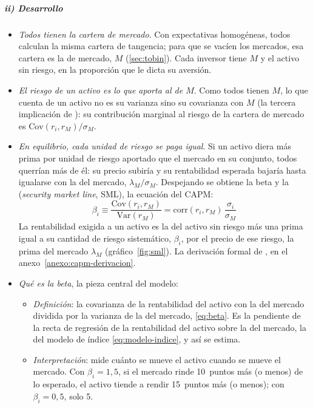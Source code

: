 \documentclass[11pt]{article}
\begin{document}
\subparagraph{ii) Desarrollo}

\begin{itemize}
\item \emph{Todos tienen la cartera de mercado}. Con expectativas homogéneas, todos calculan la misma cartera de tangencia; para que se vacíen los mercados, esa cartera es la de mercado, $M$ (\ref{sec:tobin}). Cada inversor tiene $M$ y el activo sin riesgo, en la proporción que le dicta su aversión.
\item \emph{El riesgo de un activo es lo que aporta al de $M$}. Como todos tienen $M$, lo que cuenta de un activo no es su varianza sino su covarianza con $M$ (la tercera implicación de ): su contribución marginal al riesgo de la cartera de mercado es $\mathrm{Cov}(r_i,r_M)/\sigma_M$.
\item \emph{En equilibrio, cada unidad de riesgo se paga igual}. Si un activo diera más prima por unidad de riesgo aportado que el mercado en su conjunto, todos querrían más de él: su precio subiría y su rentabilidad esperada bajaría hasta igualarse con la del mercado, $\lambda_M/\sigma_M$. Despejando se obtiene la beta y la  (\emph{security market line}, SML), la ecuación del CAPM:
  \begin{equation}\label{eq:beta}
  \beta_i\equiv\frac{\mathrm{Cov}(r_i,r_M)}{\mathrm{Var}(r_M)}=\mathrm{corr}(r_i,r_M)\,\frac{\sigma_i}{\sigma_M}
  \end{equation}
  La rentabilidad exigida a un activo es la del activo sin riesgo más una prima igual a su cantidad de riesgo sistemático, $\beta_i$, por el precio de ese riesgo, la prima del mercado $\lambda_M$ (gráfico~\ref{fig:sml}). La derivación formal de \textcite{Sharpe1964Capital}, en el anexo~\ref{anexo:capm-derivacion}.
\item \emph{Qué es la beta}, la pieza central del modelo:
  \begin{itemize}
  \item \emph{Definición}: la covarianza de la rentabilidad del activo con la del mercado dividida por la varianza de la del mercado, \eqref{eq:beta}. Es la pendiente de la recta de regresión de la rentabilidad del activo sobre la del mercado, la del modelo de índice \eqref{eq:modelo-indice}, y así se estima.
  \item \emph{Interpretación}: mide cuánto se mueve el activo cuando se mueve el mercado. Con $\beta_i=1{,}5$, si el mercado rinde 10~puntos más (o menos) de lo esperado, el activo tiende a rendir 15~puntos más (o menos); con $\beta_i=0{,}5$, solo 5.

\end{itemize}
\end{itemize}
\end{document}
